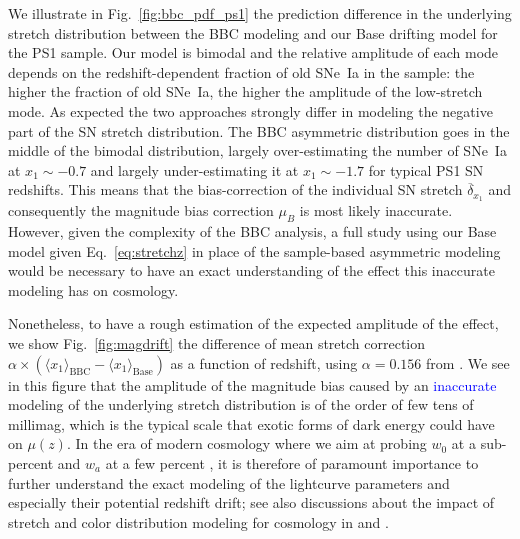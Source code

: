 \documentclass[]{aa} %
\newcommand{\mr}[1]{{\textcolor[rgb]{0.60,0.10,0.6}{#1}}}
\newcommand{\yc}[1]{{\textcolor{blue}{#1}}}
\begin{document}
\mr{We illustrate in Fig.~\ref{fig:bbc_pdf_ps1} the prediction difference in the
underlying stretch distribution between the BBC modeling and our Base drifting
model for the PS1 sample. Our model is bimodal and the relative
amplitude of each mode depends on the redshift-dependent fraction of old SNe~Ia in the sample: the higher the fraction of old SNe~Ia, the higher the amplitude of the
low-stretch mode. As expected the two
approaches strongly differ in modeling the negative part of the SN stretch
distribution. The BBC asymmetric distribution goes in the middle of the bimodal
distribution, largely over-estimating the number of SNe~Ia at $x_1\sim-0.7$ and
largely under-estimating it at $x_1\sim-1.7$ for typical PS1 SN redshifts. This
means that the bias-correction of the individual SN stretch
$\overline{\delta}_{x_1}$ \citep{kessler2017} and consequently the magnitude
bias correction $\mu_B$ is most likely inaccurate. However, given the complexity
of the BBC analysis, a full study using our Base model given
Eq.~\ref{eq:stretchz} in place of the sample-based asymmetric modeling would be
necessary to have an exact understanding of the effect this inaccurate modeling
has on cosmology.}

\mr{Nonetheless, to have a rough estimation of the expected amplitude of the
effect, we show Fig.~\ref{fig:magdrift} the difference of mean stretch
correction $\alpha\times\left(\langle x_1 \rangle_{\mathrm{BBC}} - \langle x_1
\rangle_{\mathrm{Base}}\right)$ as a function of redshift, using $\alpha=0.156$
from \cite{scolnic2018a}. We see in this figure that the amplitude of the
magnitude bias caused by an \yc{inaccurate} modeling of the underlying stretch
distribution is of the order of few tens of millimag, which is the typical scale
that exotic forms of dark energy could have on $\mu(z)$. In the era of modern
cosmology where we aim at probing $w_0$ at a sub-percent and $w_a$ at a few
percent \citep[e.g.,][]{lsstpaper}, it is therefore of paramount importance to
further understand the exact modeling of the lightcurve parameters and
especially their potential redshift drift; see also discussions about the impact
of stretch and color distribution modeling for cosmology in \citealt{rubin2015}
and \citealt{rubin2016}.}
\end{document}
